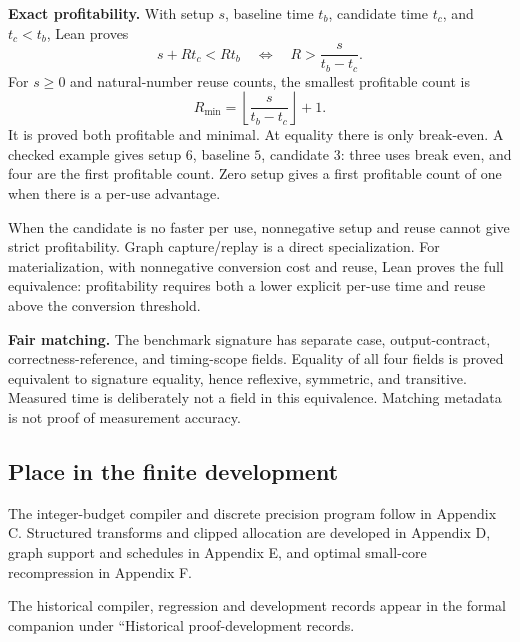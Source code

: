 \textbf{Exact profitability.} With setup $s$, baseline time $t_b$, candidate time $t_c$, and $t_c<t_b$, Lean proves
\[
\boxed{s+Rt_c<Rt_b\quad\Longleftrightarrow\quad
R>\frac{s}{t_b-t_c}.}
\]
For $s\geq0$ and natural-number reuse counts, the smallest profitable count is
\[
\boxed{R_{\min}=\left\lfloor\frac{s}{t_b-t_c}\right\rfloor+1.}
\]
It is proved both profitable and minimal. At equality there is only break-even. A checked example gives setup $6$, baseline $5$, candidate $3$: three uses break even, and four are the first profitable count. Zero setup gives a first profitable count of one when there is a per-use advantage.

When the candidate is no faster per use, nonnegative setup and reuse cannot give strict profitability. Graph capture/replay is a direct specialization. For materialization, with nonnegative conversion cost and reuse, Lean proves the full equivalence: profitability requires both a lower explicit per-use time and reuse above the conversion threshold.

\textbf{Fair matching.} The benchmark signature has separate case, output-contract, correctness-reference, and timing-scope fields. Equality of all four fields is proved equivalent to signature equality, hence reflexive, symmetric, and transitive. Measured time is deliberately not a field in this equivalence. Matching metadata is not proof of measurement accuracy.



\subsection{Place in the finite development}\label{supp2:subsection:007}
The integer-budget compiler and discrete precision program follow in Appendix C. Structured transforms and clipped allocation are developed in Appendix D, graph support and schedules in Appendix E, and optimal small-core recompression in Appendix F.

The historical compiler, regression and development records appear in the formal companion under ``Historical proof-development records.
